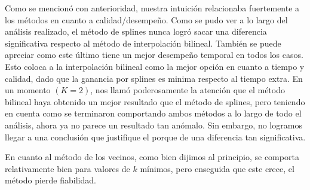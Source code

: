 Como se mencionó con anterioridad, nuestra intuición relacionaba fuertemente a los métodos en cuanto a calidad/desempeño.
Como se pudo ver a lo largo del análisis realizado, el método de splines nunca logró sacar una diferencia significativa respecto al método de interpolación bilineal. También se puede apreciar como este último tiene un mejor desempeño temporal en todos los casos.
Esto coloca a la interpolación bilineal como la mejor opción en cuanto a tiempo y calidad, dado que la ganancia por splines es minima respecto al tiempo extra. En un momento $(K = 2)$, nos llamó poderosamente la atención que el método bilineal haya obtenido un mejor resultado que el método de splines, pero teniendo en cuenta como se terminaron comportando ambos métodos a lo largo de todo el análisis, ahora ya no parece un resultado tan anómalo. Sin embargo, no logramos llegar a una conclusión que justifique el porque de una diferencia tan significativa.

En cuanto al método de los vecinos, como bien dijimos al principio, se comporta relativamente bien para valores de $k$ mínimos, pero enseguida que este crece, el método pierde fiabilidad.
